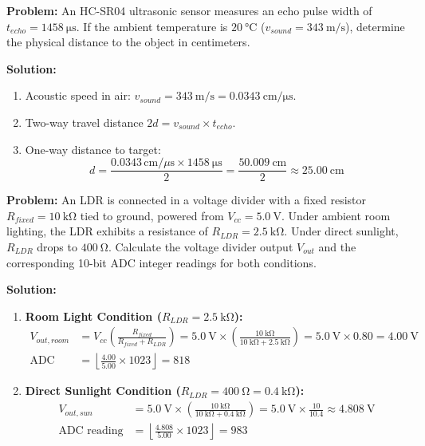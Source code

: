 \begin{examplebox}
\textbf{Problem:} An HC-SR04 ultrasonic sensor measures an echo pulse width of $t_{echo} = \SI{1458}{\micro\second}$. If the ambient temperature is $\SI{20}{\celsius}$ ($v_{sound} = \SI{343}{\meter\per\second}$), determine the physical distance to the object in centimeters.

\textbf{Solution:}
\begin{enumerate}
    \item Acoustic speed in air: $v_{sound} = \SI{343}{\meter\per\second} = \SI{0.0343}{\centi\meter\per\micro\second}$.
    \item Two-way travel distance $2d = v_{sound} \times t_{echo}$.
    \item One-way distance to target:
    \begin{equation}
    d = \frac{0.0343\,\text{cm}/\mu\text{s} \times \SI{1458}{\micro\second}}{2} = \frac{\SI{50.009}{\centi\meter}}{2} \approx \SI{25.00}{\centi\meter}
    \end{equation}
\end{enumerate}
\end{examplebox}

\begin{examplebox}
\textbf{Problem:} An LDR is connected in a voltage divider with a fixed resistor $R_{fixed} = \SI{10}{\kilo\ohm}$ tied to ground, powered from $V_{cc} = \SI{5.0}{\volt}$. Under ambient room lighting, the LDR exhibits a resistance of $R_{LDR} = \SI{2.5}{\kilo\ohm}$. Under direct sunlight, $R_{LDR}$ drops to $\SI{400}{\ohm}$. Calculate the voltage divider output $V_{out}$ and the corresponding 10-bit ADC integer readings for both conditions.

\textbf{Solution:}
\begin{enumerate}
    \item \textbf{Room Light Condition ($R_{LDR} = \SI{2.5}{\kilo\ohm}$):}
    \begin{align*}
    V_{out, room} &= V_{cc} \left( \frac{R_{fixed}}{R_{fixed} + R_{LDR}} \right) = \SI{5.0}{\volt} \times \left( \frac{\SI{10}{\kilo\ohm}}{\SI{10}{\kilo\ohm} + \SI{2.5}{\kilo\ohm}} \right) = \SI{5.0}{\volt} \times 0.80 = \SI{4.00}{\volt} \\
    \text{ADC reading} &= \left\lfloor \frac{4.00}{5.00} \times 1023 \right\rfloor = 818
    \end{align*}
    \item \textbf{Direct Sunlight Condition ($R_{LDR} = \SI{400}{\ohm} = \SI{0.4}{\kilo\ohm}$):}
    \begin{align*}
    V_{out, sun} &= \SI{5.0}{\volt} \times \left( \frac{\SI{10}{\kilo\ohm}}{\SI{10}{\kilo\ohm} + \SI{0.4}{\kilo\ohm}} \right) = \SI{5.0}{\volt} \times \frac{10}{10.4} \approx \SI{4.808}{\volt} \\
    \text{ADC reading} &= \left\lfloor \frac{4.808}{5.00} \times 1023 \right\rfloor = 983
    \end{align*}
\end{enumerate}
\end{examplebox}

